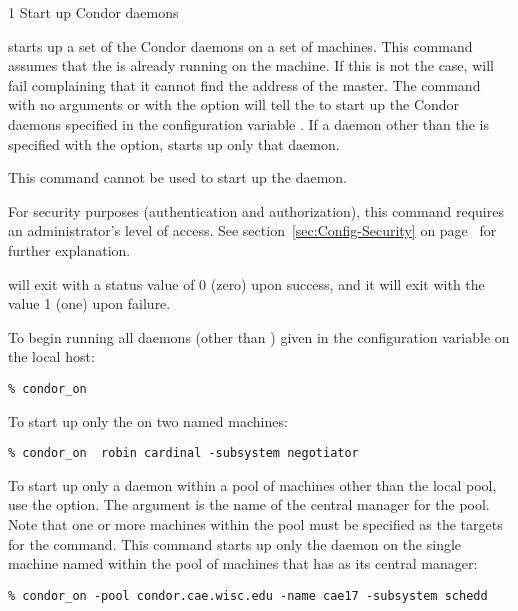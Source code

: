 \begin{ManPage}{\label{man-condor-on}}{1}
{Start up Condor daemons}
\Synopsis {}
\ToolArgsBase

\ToolDebugOption
\ToolArgsLocate \ToolArgsAffect

\ToolDebugOption
\ToolWhere \ToolArgsAffect


\Description 

 starts up a set of the Condor daemons on a set of
machines.
This command assumes that the  is already
running on the machine.
If this is not the case,  will
fail complaining that it cannot find the address of the master.
The command  with no arguments or with
 the  option will
tell the  to start up the Condor daemons specified
in the configuration variable .
If a daemon other than the  is specified
with the  option,
 starts up only that daemon.

This command cannot be used to start up the  daemon.

For security purposes (authentication and authorization),
this command requires an administrator's level of access.
See
section~\ref{sec:Config-Security} on page~\pageref{sec:Config-Security}
for further explanation.

\begin{Options}
	\ToolArgsDesc
	\ToolDebugDesc
\end{Options}

\ExitStatus

 will exit with a status value of 0 (zero) upon success,
and it will exit with the value 1 (one) upon failure.

\Examples
To begin running all daemons (other than ) given
in the configuration variable 
on the local host:
\begin{verbatim}
% condor_on
\end{verbatim}

To start up only the  on two named machines:
\begin{verbatim}
% condor_on  robin cardinal -subsystem negotiator
\end{verbatim}

To start up only a daemon within a pool of machines
other than the local pool, use the  option.
The argument is the name of the central manager for the pool.
Note that one or more machines within the pool must be
specified as the targets for the command.
This command starts up only the  daemon
on the single machine named  within the
pool of machines that has  as
its central manager:
\begin{verbatim}
% condor_on -pool condor.cae.wisc.edu -name cae17 -subsystem schedd
\end{verbatim}

\end{ManPage}
